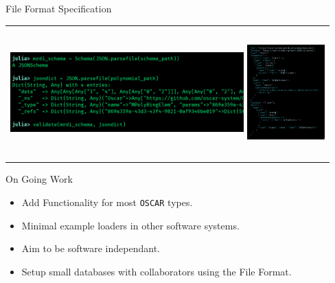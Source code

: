 \documentclass[9pt]{beamer}
\newcommand\oscar{\texttt{OSCAR}\xspace}
\theoremstyle{definition}
\begin{document}
\begin{frame}[fragile]{File Format Specification}
  \begin{tabular}{c}
    \includegraphics[height=5cm, width=9cm]{images/schema-demo}
    \includegraphics[height=5cm, width=3cm]{images/schema}
    \end{tabular}
\end{frame}



\begin{frame}[fragile]{On Going Work}
  \begin{itemize}
  \item Add Functionality for most \oscar types.
  \item Minimal example loaders in other software systems.
  \item Aim to be software independant.
  \item Setup small databases with collaborators using the File Format.
  \end{itemize}
\end{frame}
\end{document}
